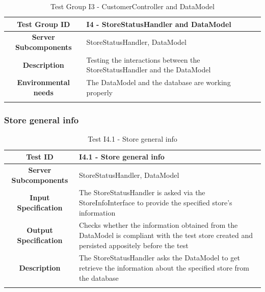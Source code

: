 \documentclass[a4paper,oneside,11pt]{book}
\begin{document}
    \begin{longtable}[c]{|>{\bfseries{}}c|H{.5\textwidth}|}
        \hline
        Test Group ID & I4 - StoreStatusHandler and DataModel \\ \hline
        Server Subcomponents & StoreStatusHandler, DataModel \\ \hline
        Description & Testing the interactions between the StoreStatusHandler and the DataModel \\ \hline
        Environmental needs & The DataModel and the database are working properly \\ \hline
        \caption{Test Group I3 - CustomerController and DataModel}
        \label{table:test_I3}
    \end{longtable}
    
    
    \newpage
    \subsubsection{Store general info}
    \begin{longtable}[c]{|>{\bfseries{}}c|H{.5\textwidth}|}
        \hline
        Test ID & I4.1 - Store general info \\ \hline
        Server Subcomponents & StoreStatusHandler, DataModel \\ \hline
        Input Specification & The StoreStatusHandler is asked via the StoreInfoInterface to provide the specified store’s information \\ \hline
        Output Specification & Checks whether the information obtained from the DataModel is compliant with the test store created and persisted appositely before the test \\ \hline
        Description & The StoreStatusHandler asks the DataModel to get retrieve the information about the specified store from the database \\ \hline
        \caption{Test I4.1 - Store general info}
        \label{table:test_I4.1}
    \end{longtable}
    
    
\end{document}
